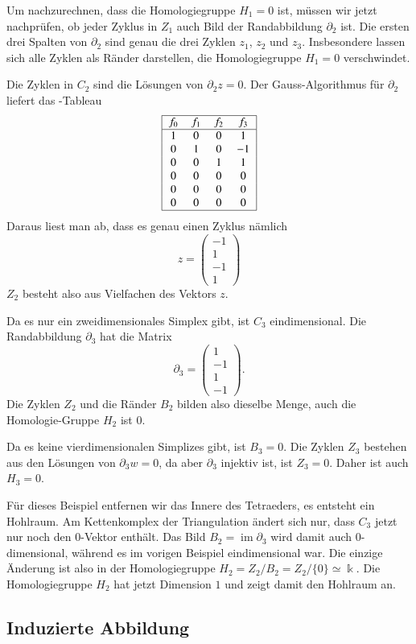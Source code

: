 \begin{beispiel}
Um nachzurechnen, dass die Homologiegruppe $H_1=0$ ist, müssen wir jetzt 
nachprüfen, ob jeder Zyklus in $Z_1$ auch Bild der Randabbildung $\partial_2$
ist.
Die ersten drei Spalten von $\partial_2$ sind genau die drei Zyklen
$z_1$, $z_2$ und $z_3$.
Insbesondere lassen sich alle Zyklen als Ränder darstellen, die
Homologiegruppe $H_1=0$ verschwindet.

Die Zyklen in $C_2$ sind die Lösungen von $\partial_2z=0$.
Der Gauss-Algorithmus für $\partial_2$ liefert das -Tableau
\[
\begin{tabular}{|>{$}c<{$}>{$}c<{$}>{$}c<{$}>{$}c<{$}|}
\hline
f_0&f_1&f_2&f_3\\
\hline
1&0&0& 1\\
0&1&0&-1\\
0&0&1& 1\\
0&0&0& 0\\
0&0&0& 0\\
0&0&0& 0\\
\hline
\end{tabular}
\]
Daraus liest man ab, dass es genau einen Zyklus nämlich
\[
z
=
\begin{pmatrix}
-1\\1\\-1\\1
\end{pmatrix}
\]
$Z_2$ besteht also aus Vielfachen des Vektors $z$.

Da es nur ein zweidimensionales Simplex gibt, ist $C_3$ eindimensional.
Die Randabbildung $\partial_3$ hat die Matrix
\[
\partial_3
=
\begin{pmatrix}
1\\
-1\\
1\\
-1
\end{pmatrix}.
\]
Die Zyklen $Z_2$ und die Ränder $B_2$ bilden also dieselbe Menge, auch
die Homologie-Gruppe $H_2$ ist $0$.

Da es keine vierdimensionalen Simplizes gibt, ist $B_3=0$.
Die Zyklen $Z_3$ bestehen aus den Lösungen von $\partial_3w=0$, da
aber $\partial_3$ injektiv ist, ist $Z_3=0$.
Daher ist auch $H_3=0$.
\end{beispiel}

\begin{beispiel}
Für dieses Beispiel entfernen wir das Innere des Tetraeders, es entsteht
ein Hohlraum.
Am Kettenkomplex der Triangulation ändert sich nur, dass $C_3$ jetzt 
nur noch den $0$-Vektor enthält.
Das Bild $B_2=\operatorname{im}\partial_3$ wird damit auch $0$-dimensional,
während es im vorigen Beispiel eindimensional war.
Die einzige Änderung ist also in der Homologiegruppe 
$H_2 = Z_2/B_2 = Z_2 / \{0\} \simeq \Bbbk$.
Die Homologiegruppe $H_2$ hat jetzt Dimension $1$ und zeigt damit den
Hohlraum an.
\end{beispiel}

\subsection{Induzierte Abbildung
\label{buch:subsection:induzierte-abbildung}}


